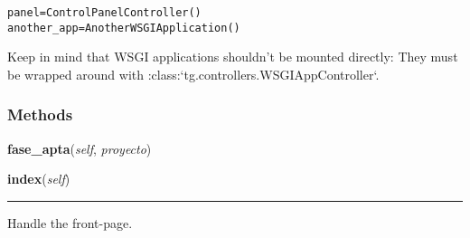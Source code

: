\begin{alltt}
   panel = ControlPanelController()
   another\_app = AnotherWSGIApplication()\end{alltt}

Keep in mind that WSGI applications shouldn't be mounted directly: They 
must be wrapped around with :class:`tg.controllers.WSGIAppController`.



  \subsubsection{Methods}

    \label{saip:controllers:root:RootController:fase_apta}

    \vspace{0.5ex}

\hspace{.8\funcindent}\begin{boxedminipage}{\funcwidth}

    \raggedright \textbf{fase\_apta}(\textit{self}, \textit{proyecto})

\setlength{\parskip}{2ex}
\setlength{\parskip}{1ex}
    \end{boxedminipage}

    \label{saip:controllers:root:RootController:index}

    \vspace{0.5ex}

\hspace{.8\funcindent}\begin{boxedminipage}{\funcwidth}

    \raggedright \textbf{index}(\textit{self})

    \vspace{-1.5ex}

    \rule{\textwidth}{0.5\fboxrule}
\setlength{\parskip}{2ex}
    Handle the front-page.

\setlength{\parskip}{1ex}
    \end{boxedminipage}

